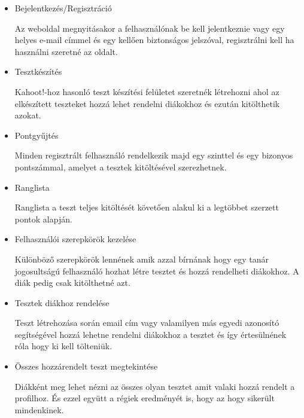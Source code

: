 \begin{itemize}
    \item {Bejelentkezés/Regisztráció}
          \begin{addmargin}[\parindent]{0pt}
              Az weboldal megnyitásakor a felhasználónak be kell jelentkeznie vagy egy helyes e-mail címmel és egy kellően biztonságos jelszóval, regisztrálni kell ha használni szeretné az oldalt.
          \end{addmargin}
    \item {Tesztkészítés}
          \begin{addmargin}[\parindent]{0pt}
              Kahoot!-hoz hasonló teszt készítési felületet szeretnék létrehozni ahol az elkészített teszteket hozzá lehet rendelni diákokhoz és ezután kitölthetik azokat.
          \end{addmargin}
    \item {Pontgyűjtés}
          \begin{addmargin}[\parindent]{0pt}
              Minden regisztrált felhasználó rendelkezik majd egy szinttel és egy bizonyos pontszámmal, amelyet a tesztek kitöltésével szerezhetnek.
          \end{addmargin}
    \item {Ranglista}
          \begin{addmargin}[\parindent]{0pt}
              Ranglista a teszt teljes kitöltését követően alakul ki a legtöbbet szerzett pontok alapján.
          \end{addmargin}
    \item {Felhasználói szerepkörök kezelése}
          \begin{addmargin}[\parindent]{0pt}
              Különböző szerepkörök lennének amik azzal bírnának hogy egy tanár jogosultságú felhasználó hozhat létre tesztet és hozzá rendelheti diákokhoz. A diák pedig csak kitölthetné azt.
          \end{addmargin}
    \item {Tesztek diákhoz rendelése}
          \begin{addmargin}[\parindent]{0pt}
              Teszt létrehozása során email cím vagy valamilyen más egyedi azonosító segítségével hozzá lehetne rendelni diákokhoz a tesztet és így értesülnének róla hogy ki kell tölteniük.
          \end{addmargin}
    \item {Összes hozzárendelt teszt megtekintése}
          \begin{addmargin}[\parindent]{0pt}
              Diákként meg lehet nézni az összes olyan tesztet amit valaki hozzá rendelt a profilhoz. És ezzel együtt a régiek eredményét is, hogy az hogy sikerült mindenkinek.
          \end{addmargin}
\end{itemize}

